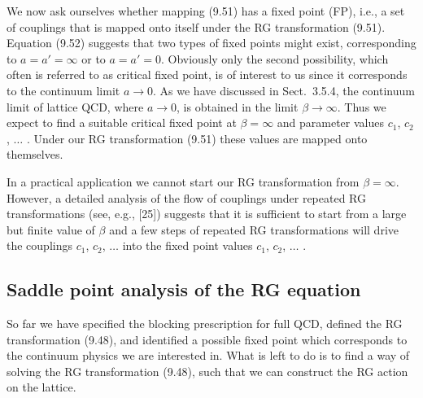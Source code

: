 We now ask ourselves whether mapping (9.51) has a fixed point (FP), i.e., a
set of couplings that is mapped onto itself under the RG transformation
(9.51). Equation (9.52) suggests that two types of fixed points might exist,
corresponding to $a = a' = \infty$ or to $a = a' = 0$. Obviously only the
second possibility, which often is referred to as critical fixed point, is of
interest to us since it corresponds to the continuum limit $a \to 0$. As we
have discussed in Sect.~3.5.4, the continuum limit of lattice QCD, where $a
\to 0$, is obtained in the limit $\beta \to \infty$. Thus we expect to find a
suitable critical fixed point at $\beta = \infty$ and parameter values $c_1$,
$c_2$, $\ldots$ . Under our RG transformation (9.51) these values are mapped
onto themselves.

In a practical application we cannot start our RG transformation from $\beta =
\infty$. However, a detailed analysis of the flow of couplings under repeated
RG transformations (see, e.g., [25]) suggests that it is sufficient to start
from a large but finite value of $\beta$ and a few steps of repeated RG
transformations will drive the couplings $c_1$, $c_2$, $\ldots$ into the fixed
point values $c_1$, $c_2$, $\ldots$ .

\subsection{Saddle point analysis of the RG equation}
\label{sec:9.3.3}

So far we have specified the blocking prescription for full QCD, defined the
RG transformation (9.48), and identified a possible fixed point which
corresponds to the continuum physics we are interested in. What is left to do
is to find a way of solving the RG transformation (9.48), such that we can
construct the RG action on the lattice.

